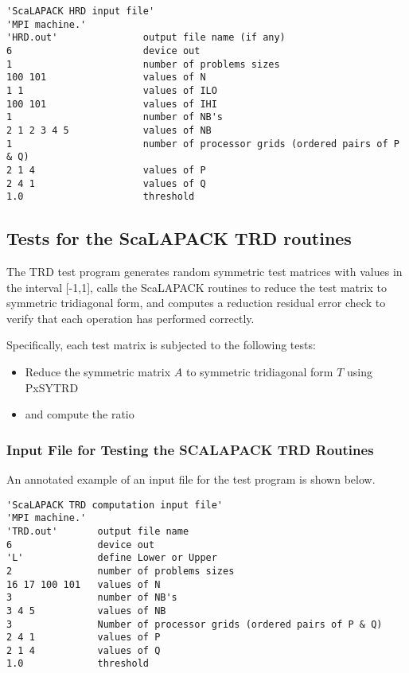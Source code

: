 \documentclass[11pt]{report}
\newcommand{\dent}{\hspace*{\parindent}}
\begin{document}
\begin{verbatim}
'ScaLAPACK HRD input file'
'MPI machine.'
'HRD.out'               output file name (if any)
6                       device out
1                       number of problems sizes
100 101                 values of N
1 1                     values of ILO
100 101                 values of IHI
1                       number of NB's
2 1 2 3 4 5             values of NB
1                       number of processor grids (ordered pairs of P & Q)
2 1 4                   values of P
2 4 1                   values of Q
1.0                     threshold
\end{verbatim}

\subsection{Tests for the ScaLAPACK TRD routines}

The TRD test program generates random symmetric test matrices with
values in the interval [-1,1], calls the ScaLAPACK 
routines to reduce the test matrix to symmetric tridiagonal form, and computes
a reduction residual error check to verify that each operation has performed 
correctly.

Specifically, each test matrix is subjected to the following tests:

\begin{itemize}
\item Reduce the symmetric matrix $A$ to symmetric tridiagonal form $T$ using PxSYTRD
\item and compute the ratio
\end{itemize}

\subsubsection{Input File for Testing the SCALAPACK TRD Routines}
\dent
An annotated example of an input file for the
test program is shown below.

\begin{verbatim}
'ScaLAPACK TRD computation input file'
'MPI machine.'
'TRD.out'       output file name
6               device out
'L'             define Lower or Upper
2               number of problems sizes
16 17 100 101   values of N
3               number of NB's
3 4 5           values of NB
3               Number of processor grids (ordered pairs of P & Q)
2 4 1           values of P
2 1 4           values of Q
1.0             threshold
\end{verbatim}
\end{document}

